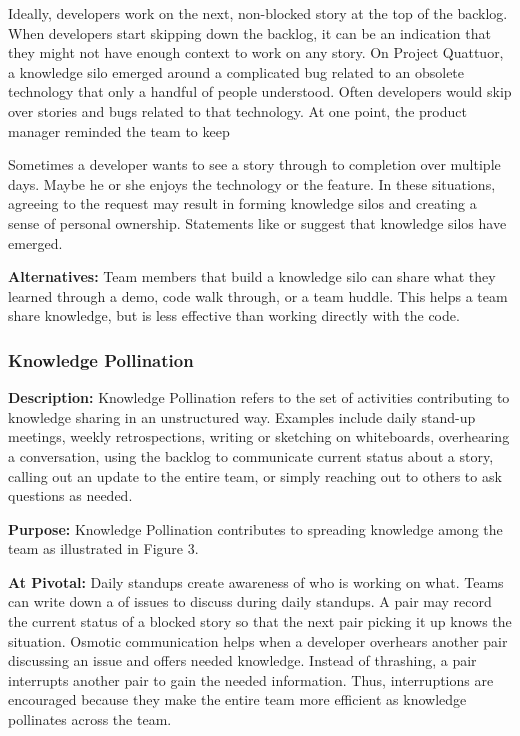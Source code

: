 Ideally, developers work on the next, non-blocked story at the top of the backlog. When developers start skipping down the backlog, it can be an indication that they might not have enough context to work on any story. On Project Quattuor, a knowledge silo emerged around a complicated bug related to an obsolete technology that only a handful of people understood. Often developers would skip over stories and bugs related to that technology. At one point, the product manager reminded the team to keep 

Sometimes a developer wants to see a story through to completion over multiple days. Maybe he or she enjoys the technology or the feature. In these situations, agreeing to the request may result in forming knowledge silos and creating a sense of personal ownership. Statements like  or  suggest that knowledge silos have emerged. 

\textbf{Alternatives:} Team members that build a knowledge silo can share what they learned through a demo, code walk through, or a team huddle. This helps a team share knowledge, but is less effective than working directly with the code. 

\subsubsection{Knowledge Pollination}
\textbf{Description:} Knowledge Pollination refers to the set of activities contributing to knowledge sharing in an unstructured way. Examples include daily stand-up meetings, weekly retrospections, writing or sketching on whiteboards, overhearing a conversation, using the backlog to communicate current status about a story, calling out an update to the entire team, or simply reaching out to others to ask questions as needed. 

\textbf{Purpose:} Knowledge Pollination contributes to spreading knowledge among the team as illustrated in Figure 3.

\textbf{At Pivotal:} Daily standups create awareness of who is working on what. Teams can write down a  of issues to discuss during daily standups. A pair may record the current status of a blocked story so that the next pair picking it up knows the situation. Osmotic communication helps when a developer overhears another pair discussing an issue and offers needed knowledge. Instead of thrashing, a pair interrupts another pair to gain the needed information. Thus, interruptions are encouraged because they make the entire team more efficient as knowledge pollinates across the team. 

